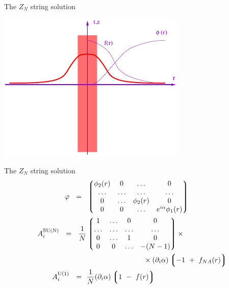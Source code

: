 \documentclass{beamer}
\begin{document}
\begin{frame}

  The $ Z_N $ string solution
  \begin{center}
    \includegraphics[width=9.0cm,decodearray={0.2 0.5}]{string.pdf}
  \end{center}

\end{frame}


\begin{frame}
  
The $ Z_N $ string solution
\begin{align*}
  \varphi ~~=~~ & \left\lgroup \begin{matrix}
    \phi_2(r)  & 0  & \ldots & 0 \\
    \ldots  &  \ldots & \ldots & \ldots \\
    0  & \ldots      & \phi_2(r) &  0 \\
    0  & 0           & \ldots  &   e^{i\alpha} \phi_1(r)
  \end{matrix}        \right\rgroup     \\
  A_i^{\rm SU(N)} ~~=~~ \frac{1}{N} & \left\lgroup \begin{matrix}
    1  & \ldots & 0 & 0 \\
    \ldots & \ldots & \ldots & \ldots \\
    0  & \ldots  & 1  &  0 \\
    0  & 0   & \ldots  &  - (N-1)
  \end{matrix} \right\rgroup  \times \\
  &       \qquad\qquad\qquad\qquad     \times(\partial_i \alpha) \left\lgroup  -1 ~+~ f_{NA}(r) \right\rgroup  \\
  A_i^{\rm U(1)} ~~=~~ & \frac{1}{N} (\partial_i \alpha) \left\lgroup 1 ~-~ f(r) \right\rgroup
\end{align*}
\end{frame}
\end{document}
